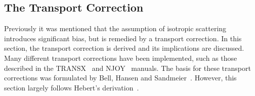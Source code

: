 \begin{appendices}
\section{The Transport Correction}
\label{app:transport-correction}

Previously it was mentioned that the assumption of isotropic scattering introduces significant bias, but is remedied by a transport correction. In this section, the transport correction is derived and its implications are discussed. Many different transport corrections have been implemented, such as those described in the TRANSX~\cite{macfarlane1993transx} and NJOY~\cite{macfarlane2000njoy} manuals. The basis for these transport corrections was formulated by Bell, Hansen and Sandmeier~\cite{bell1967transport}. However, this section largely follows Hebert's derivation~\cite{hebert2009applied}. 


\end{appendices}

